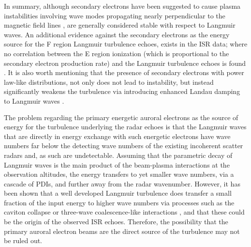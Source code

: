 In summary, although secondary electrons have been suggested to cause plasma instabilities involving wave modes propagating nearly perpendicular to the magnetic field lines \citep{basu1982,jasperse2013}, are generally considered stable with respect to Langmuir waves. 
An additional evidence against the secondary electrons as the energy source for the F region Langmuir turbulence echoes, exists in the ISR data; where no correlation between the E region ionization (which is proportional to the secondary electron production rate) and the Langmuir turbulence echoes is found \citep{akbari2013}. 
It is also worth mentioning that the presence of secondary electrons with power law-like distributions, not only does not lead to instability, but instead significantly weakens the turbulence via introducing enhanced Landau damping to Langmuir waves \citep{newman1994linear,newman1994nonlinear,akbari2015}. 

The problem regarding the primary energetic auroral electrons as the source of energy for the turbulence underlying the radar echoes is that the Langmuir waves that are directly in energy exchange with such energetic electrons have wave numbers far below the detecting wave numbers of the existing incoherent scatter radars and, as such are undetectable.
Assuming that the parametric decay of Langmuir waves is the main product of the beam-plasma interactions at the observation altitudes, the energy transfers to yet smaller wave numbers, via a cascade of PDIs, and further away from the radar wavenumber. 
However, it has been shown that a well developed Langmuir turbulence does transfer a small fraction of the input energy to higher wave numbers via processes such as the caviton collapse or three-wave coalescence-like interactions \citep{akbari2014,akbari2015}, and that these could be the origin of the observed ISR echoes. 
Therefore, the possibility that the primary auroral electron beams are the direct source of the turbulence may not be ruled out.

